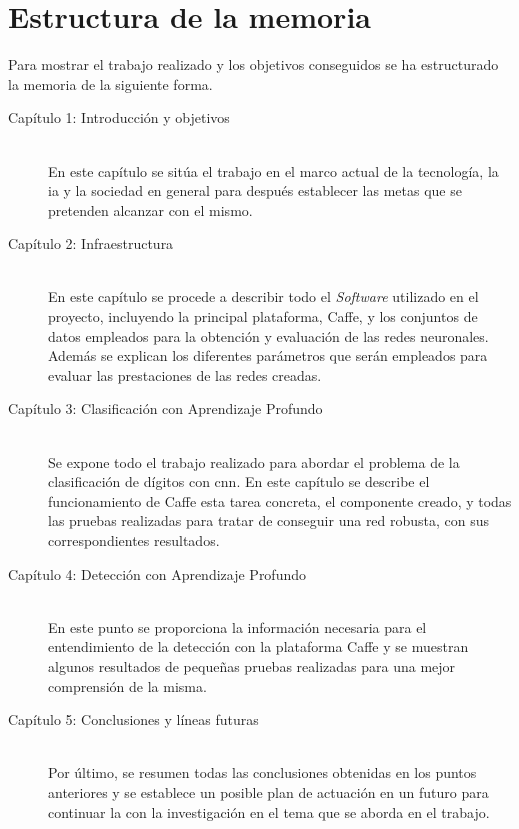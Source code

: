 \section{Estructura de la memoria}
Para mostrar el trabajo realizado y los objetivos conseguidos se ha estructurado la memoria de la siguiente forma.

\begin{description}
	\item[Capítulo 1: Introducción y objetivos] \hfill 
	\vspace{5pt}
	\\
	En este capítulo se sitúa el trabajo en el marco actual de la tecnología, la \acrshort{ia} y la sociedad en general para después establecer las metas que se pretenden alcanzar con el mismo. 
	\vspace{10pt}
	\item[Capítulo 2: Infraestructura] \hfill 
	\vspace{5pt}
	\\
	En este capítulo se procede a describir todo el \textit{Software} utilizado en el proyecto, incluyendo la principal plataforma, Caffe, y los conjuntos de datos empleados para la obtención y evaluación de las redes neuronales. Además se explican los diferentes parámetros que serán empleados para evaluar las prestaciones de las redes creadas.
	\vspace{10pt}
	\item[Capítulo 3: Clasificación con Aprendizaje Profundo ] \hfill 
	\vspace{5pt}
	\\
	Se expone todo el trabajo realizado para abordar el problema de la clasificación de dígitos con \acrshort{cnn}. En este capítulo se describe el funcionamiento de Caffe esta tarea concreta, el componente creado, y todas las pruebas realizadas para tratar de conseguir una red robusta, con sus correspondientes resultados.
	\vspace{10pt}
	\item[Capítulo 4: Detección con Aprendizaje Profundo ] \hfill 
	\vspace{5pt}
	\\
	En este punto se proporciona la información necesaria para el entendimiento de la detección con la plataforma Caffe y se muestran algunos resultados de pequeñas pruebas realizadas para una mejor comprensión de la misma.
	\vspace{10pt}
	\item[Capítulo 5: Conclusiones y líneas futuras] \hfill 
	\vspace{5pt}
	\\
	Por último, se resumen todas las conclusiones obtenidas en los puntos anteriores y se establece un posible plan de actuación en un futuro para continuar la con la investigación en el tema que se aborda en el trabajo.
\end{description}